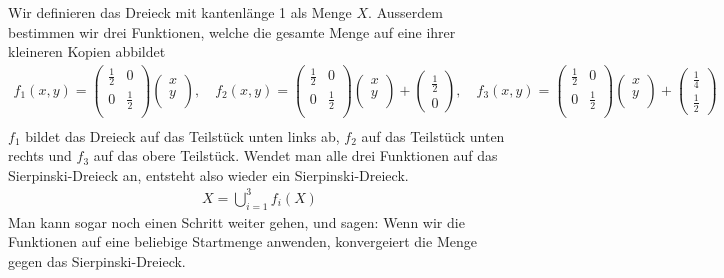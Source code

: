 Wir definieren das Dreieck mit kantenlänge 1 als Menge $X$.
Ausserdem bestimmen wir drei Funktionen, welche die gesamte Menge auf eine ihrer kleineren Kopien abbildet
\begin{align*}
	f_1(x,y)
	= 
	\begin{pmatrix}
		\frac{1}{2} & 0 \\
		0 & \frac{1}{2} \\
	\end{pmatrix}
	\begin{pmatrix}
		x\\
		y\\
	\end{pmatrix} 
	,\quad
	f_2(x,y)
	= 
	\begin{pmatrix}
		\frac{1}{2} & 0 \\
		0 & \frac{1}{2} \\
	\end{pmatrix}
	\begin{pmatrix}
		x\\
		y\\
	\end{pmatrix} 
	+
	\begin{pmatrix}
		\frac{1}{2} \\
		0
	\end{pmatrix}
	, \quad
	f_3(x,y)
	= 
	\begin{pmatrix}
		\frac{1}{2} & 0 \\
		0 & \frac{1}{2} \\
	\end{pmatrix}
	\begin{pmatrix}
		x\\
		y\\
	\end{pmatrix} 
	+
	\begin{pmatrix}
		\frac{1}{4} \\
		\frac{1}{2}
	\end{pmatrix}\\
\end{align*}
$f_1$ bildet das Dreieck auf das Teilstück unten links ab, $f_2$ auf das Teilstück unten rechts und $f_3$ auf das obere Teilstück.
Wendet man alle drei Funktionen auf das Sierpinski-Dreieck an, entsteht also wieder ein Sierpinski-Dreieck.
\begin{align*}
	X = \bigcup\limits_{i = 1}^{3} f_i(X)
\end{align*}
Man kann sogar noch einen Schritt weiter gehen, und sagen: Wenn wir die Funktionen auf eine beliebige Startmenge anwenden, konvergeiert die Menge gegen das Sierpinski-Dreieck.
